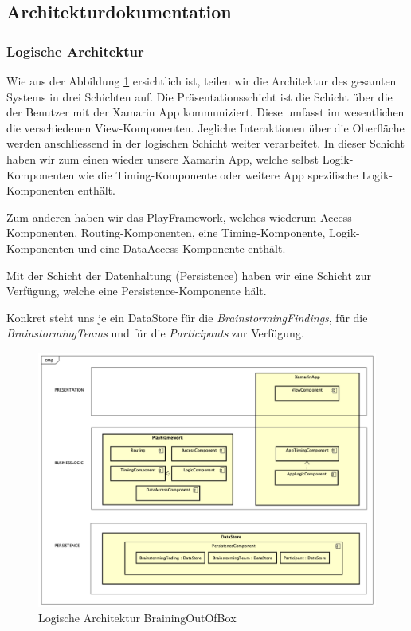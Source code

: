 \subsection{Architekturdokumentation}

\subsubsection{Logische Architektur}
Wie aus der Abbildung \ref{fig:architektur-methode635} ersichtlich ist, teilen wir die Architektur des gesamten Systems in drei Schichten auf. Die Präsentationsschicht ist die Schicht über die der Benutzer mit der Xamarin App kommuniziert. Diese umfasst im wesentlichen die verschiedenen View-Komponenten. Jegliche Interaktionen über die Oberfläche werden anschliessend in der logischen Schicht weiter verarbeitet. In dieser Schicht haben wir zum einen wieder unsere Xamarin App, welche selbst Logik-Komponenten wie die Timing-Komponente oder weitere App spezifische Logik-Komponenten enthält. 

Zum anderen haben wir das PlayFramework, welches wiederum Access-Komponenten, Routing-Komponenten, eine Timing-Komponente, Logik-Komponenten und eine DataAccess-Komponente enthält.

Mit der Schicht der Datenhaltung (Persistence) haben wir eine Schicht zur Verfügung, welche eine Persistence-Komponente hält.

Konkret steht uns je ein DataStore für die \textit{BrainstormingFindings}, für die \textit{BrainstormingTeams} und für die \textit{Participants} zur Verfügung.


\begin{figure}[h]
	\centering
	\includegraphics[width=1\linewidth]{img/architektur/CD_Methode635}
	\caption{Logische Architektur BrainingOutOfBox}
	\label{fig:architektur-methode635}
\end{figure}

